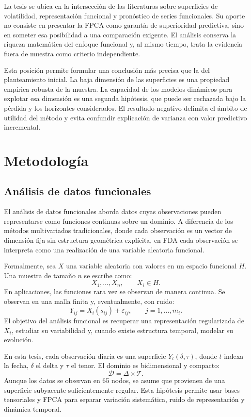 \documentclass[a4paper,11pt]{article}
\begin{document}
La tesis se ubica en la intersección de las literaturas sobre superficies de volatilidad, representación funcional y pronóstico de series funcionales. Su aporte no consiste en presentar la FPCA como garantía de superioridad predictiva, sino en someter esa posibilidad a una comparación exigente. El análisis conserva la riqueza matemática del enfoque funcional y, al mismo tiempo, trata la evidencia fuera de muestra como criterio independiente.

Esta posición permite formular una conclusión más precisa que la del planteamiento inicial. La baja dimensión de las superficies es una propiedad empírica robusta de la muestra. La capacidad de los modelos dinámicos para explotar esa dimensión es una segunda hipótesis, que puede ser rechazada bajo la pérdida y los horizontes considerados. El resultado negativo delimita el ámbito de utilidad del método y evita confundir explicación de varianza con valor predictivo incremental.

\section{Metodología}

\subsection{Análisis de datos funcionales}

El análisis de datos funcionales aborda datos cuyas observaciones pueden representarse como funciones continuas sobre un dominio. A diferencia de los métodos multivariados tradicionales, donde cada observación es un vector de dimensión fija sin estructura geométrica explícita, en FDA cada observación se interpreta como una realización de una variable aleatoria funcional.

Formalmente, sea \(X\) una variable aleatoria con valores en un espacio funcional \(H\). Una muestra de tamaño \(n\) se escribe como:
\[
  X_1,\ldots,X_n,\qquad X_i\in H.
\]
En aplicaciones, las funciones rara vez se observan de manera continua. Se observan en una malla finita y, eventualmente, con ruido:
\[
  Y_{ij}=X_i(s_{ij})+\varepsilon_{ij},
  \qquad j=1,\ldots,m_i.
\]
El objetivo del análisis funcional es recuperar una representación regularizada de \(X_i\), estudiar su variabilidad y, cuando existe estructura temporal, modelar su evolución.

En esta tesis, cada observación diaria es una superficie \(Y_t(\delta,\tau)\), donde \(t\) indexa la fecha, \(\delta\) el delta y \(\tau\) el tenor. El dominio es bidimensional y compacto:
\[
  \mathcal{D}=\Delta\times \mathcal{T}.
\]
Aunque los datos se observan en 65 nodos, se asume que provienen de una superficie subyacente suficientemente regular. Esta hipótesis permite usar bases tensoriales y FPCA para separar variación sistemática, ruido de representación y dinámica temporal.
\end{document}
